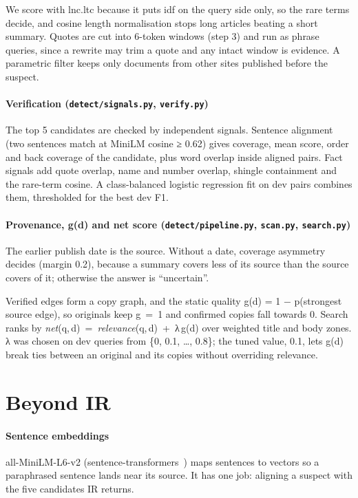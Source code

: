 \documentclass[11pt,a4paper]{article}
\newcommand{\code}[1]{\texttt{#1}}
\begin{document}
We score with lnc.ltc because it puts idf on the query side only, so the rare terms decide, and cosine length normalisation stops long articles beating a short summary. Quotes are cut into 6-token windows (step 3) and run as phrase queries, since a rewrite may trim a quote and any intact window is evidence. A parametric filter keeps only documents from other sites published before the suspect.

\paragraph{Verification (\code{detect/signals.py}, \code{verify.py})} The top 5 candidates are checked by independent signals. Sentence alignment (two sentences match at MiniLM cosine ≥ 0.62) gives coverage, mean score, order and back coverage of the candidate, plus word overlap inside aligned pairs. Fact signals add quote overlap, name and number overlap, shingle containment and the rare-term cosine. A class-balanced logistic regression fit on dev pairs combines them, thresholded for the best dev F1.

\paragraph{Provenance, g(d) and net score (\code{detect/pipeline.py}, \code{scan.py}, \code{search.py})} The earlier publish date is the source. Without a date, coverage asymmetry decides (margin 0.2), because a summary covers less of its source than the source covers of it; otherwise the answer is ``uncertain''.

Verified edges form a copy graph, and the static quality g(d) = 1 − p(strongest source edge), so originals keep g~=~1 and confirmed copies fall towards 0. Search ranks by \textit{net}(q,\,d)~=~\textit{relevance}(q,\,d)~+~λ\,g(d) over weighted title and body zones. λ was chosen on dev queries from \{0, 0.1, \ldots, 0.8\}; the tuned value, 0.1, lets g(d) break ties between an original and its copies without overriding relevance.

\section{Beyond IR}

\paragraph{Sentence embeddings} all-MiniLM-L6-v2 (sentence-transformers~\cite{reimers2019}) maps sentences to vectors so a paraphrased sentence lands near its source. It has one job: aligning a suspect with the five candidates IR returns.
\end{document}
